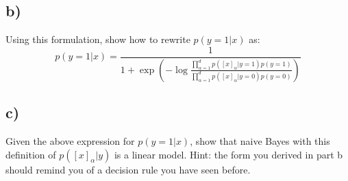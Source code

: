\documentclass[a4paper]{article}
\begin{document}
\subsection*{b)}
Using this formulation, show how to rewrite $p(y=1|x)$ as:
$$
p(y=1|x) = \frac{1}{1+\exp{\left(-\log\frac{\prod_{\alpha=1}^{d} p([x]_{\alpha}|y=1)p(y=1)}{\prod_{\alpha=1}^{d} p([x]_{\alpha}|y=0)p(y=0)}\right)}}
$$

\subsection*{c)}
Given the above expression for $p(y=1|x)$, show that naive Bayes with this definition of $p([x]_{\alpha}|y)$ is a linear model. Hint: the form you derived in part b should remind you of a decision rule you have seen before.
\end{document}
